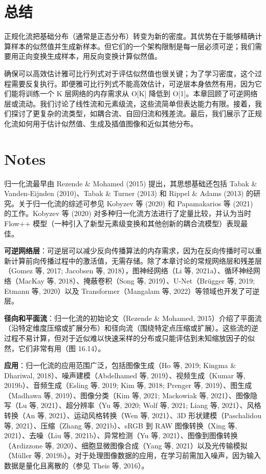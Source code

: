\section{总结}
正规化流把基础分布（通常是正态分布）转变为新的密度。其优势在于能够精确计算样本的似然值并生成新样本。但它们的一个架构限制是每一层必须可逆；我们需要用正向变换生成样本，用反向变换计算似然值。

确保可以高效估计雅可比行列式对于评估似然值也很关键；为了学习密度，这个过程需要反复执行。即便雅可比行列式不能高效估计，可逆层本身依然有用，因为它们能将训练一个 K 层网络的内存需求从 O[K] 降低到 O[1]。本章回顾了可逆网络层或流动。我们讨论了线性流和元素级流，这些流简单但表达能力有限。接着，我们探讨了更复杂的流类型，如耦合流、自回归流和残差流。最后，我们展示了正规化流如何用于估计似然值、生成及插值图像和近似其他分布。

\section{Notes}
归一化流最早由 Rezende \& Mohamed (2015) 提出，其思想基础还包括 Tabak \& Vanden-Eijnden (2010)、Tabak \& Turner (2013) 和 Rippel \& Adams (2013) 的研究。关于归一化流的综述可参见 Kobyzev 等 (2020) 和 Papamakarios 等 (2021) 的工作。Kobyzev 等 (2020) 对多种归一化流方法进行了定量比较，并认为当时 Flow++ 模型（一种引入了新型元素级变换和其他创新的耦合流模型）表现最佳。

\textbf{可逆网络层}：可逆层可以减少反向传播算法的内存需求，因为在反向传播时可以重新计算前向传播过程中的激活值，无需存储。除了本章讨论的常规网络层和残差层（Gomez 等, 2017; Jacobsen 等, 2018），图神经网络（Li 等, 2021a）、循环神经网络（MacKay 等, 2018）、掩蔽卷积（Song 等, 2019）、U-Net（Brügger 等, 2019; Etmann 等, 2020）以及 Transformer（Mangalam 等, 2022）等领域也开发了可逆层。

\textbf{径向和平面流}：归一化流的初始论文（Rezende \& Mohamed, 2015）介绍了平面流（沿特定维度压缩或扩展分布）和径向流（围绕特定点压缩或扩展）。这些流的逆过程不易计算，但对于近似难以快速采样的分布或只能评估到未知缩放因子的似然，它们非常有用（图 16.14）。

\textbf{应用}：归一化流的应用范围广泛，包括图像生成（Ho 等, 2019; Kingma \& Dhariwal, 2018）、噪声建模（Abdelhamed 等, 2019）、视频生成（Kumar 等, 2019b）、音频生成（Esling 等, 2019; Kim 等, 2018; Prenger 等, 2019）、图生成（Madhawa 等, 2019）、图像分类（Kim 等, 2021; Mackowiak 等, 2021）、图像隐写（Lu 等, 2021）、超分辨率（Yu 等, 2020; Wolf 等, 2021; Liang 等, 2021）、风格转换（An 等, 2021）、运动风格转换（Wen 等, 2021）、3D 形状建模（Paschalidou 等, 2021）、压缩（Zhang 等, 2021b）、sRGB 到 RAW 图像转换（Xing 等, 2021）、去噪（Liu 等, 2021b）、异常检测（Yu 等, 2021）、图像到图像转换（Ardizzone 等, 2020）、细胞显微图像合成（Yang 等, 2021）以及光传输模拟（Müller 等, 2019b）。对于处理图像数据的应用，在学习前需加入噪声，因为输入数据是量化且离散的（参见 Theis 等, 2016）。

